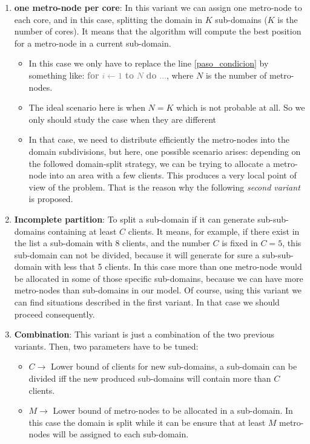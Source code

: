 \begin{enumerate}
\item {\bf one metro-node per core}: In this variant we can assign one metro-node to each core, and in this case, splitting the domain in $K$ sub-domains ($K$ is the number of cores). It means that the algorithm will compute the best position for a metro-node in a current sub-domain. \label{var1}
\begin{itemize}
\item In this case we only have to replace the line \ref{paso_condicion} by something like:  \textcolor{gray}{{\bf for} $i \leftarrow 1$ {\bf to} $N$ {\bf do} $\dots$}, 
where $N$ is the number of metro-nodes.
\item The ideal scenario here is when $N = K$ which is not probable at all. So we only should study the case when they are different
\item In that case, we need to distribute efficiently the metro-nodes into the domain subdivisions, but here, one possible scenario arises: depending on the followed domain-split strategy, we can be trying to allocate a metro-node into an area with a few clients. This produces a very local point of view of the problem. That is the reason why the following \textit{second variant} is proposed.
\end{itemize}
\item {\bf Incomplete partition}: To split a sub-domain if it can generate sub-sub-domains containing at least $C$ clients. It means, for example, if there exist in the list a sub-domain with 8 clients, and the number $C$ is fixed in $C = 5$, this sub-domain can not be divided, because it will generate for sure a sub-sub-domain with less that 5 clients. In this case more than one metro-node would be allocated in some of those specific sub-domains, because we can have more metro-nodes than sub-domains in our model. Of course, using this variant we can find situations described in the first variant. In that case we should proceed consequently. \label{var2}
\item {\bf Combination}: This variant is just a combination of the two previous variants. Then, two parameters have to be tuned: \label{var3}
\begin{itemize}
\item $C \rightarrow$ Lower bound of clients for new sub-domains, \ie a sub-domain can be divided iff the new produced sub-domains will contain more than $C$ clients.
\item $M \rightarrow$ Lower bound of metro-nodes to be allocated in a sub-domain. In this case the domain is split while it can be ensure that at least $M$ metro-nodes will be assigned to each sub-domain.
\end{itemize}
\end{enumerate}

